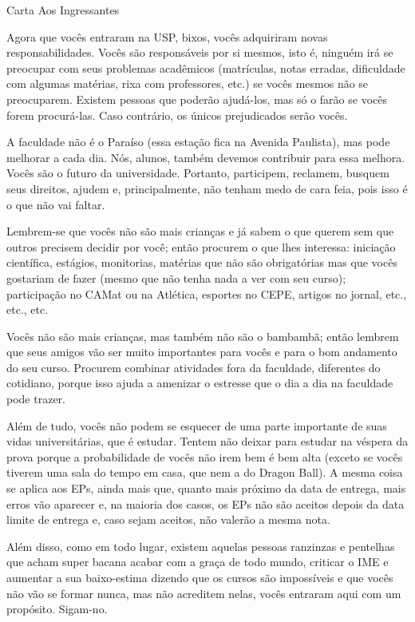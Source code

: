 \begin{editorial}{Carta Aos Ingressantes}

Agora que vocês entraram na USP, bixos, vocês adquiriram novas
responsabilidades.  Vocês são responsáveis por si mesmos, isto é, ninguém irá se
preocupar com seus problemas acadêmicos (matrículas, notas erradas, dificuldade
com algumas matérias, rixa com professores, etc.) se vocês mesmos não se
preocuparem. Existem pessoas que poderão ajudá-los, mas só o farão se vocês
forem procurá-las. Caso contrário, os únicos prejudicados serão vocês.

A faculdade não é o Paraíso (essa estação fica na Avenida Paulista), mas pode
melhorar a cada dia. Nós, alunos, também devemos contribuir para essa melhora.
Vocês são o futuro da universidade. Portanto, participem, reclamem, busquem seus
direitos, ajudem e, principalmente, não tenham medo de cara feia, pois isso é o
que não vai faltar.

Lembrem-se que vocês não são mais crianças e já sabem o que querem sem que
outros precisem decidir por você; então procurem o que lhes interessa: iniciação
científica, estágios, monitorias, matérias que não são obrigatórias mas que
vocês gostariam de fazer (mesmo que não tenha nada a ver com seu curso);
participação no CAMat ou na Atlética, esportes no CEPE, artigos no jornal, etc.,
etc., etc.

Vocês não são mais crianças, mas também não são o bambambã; então lembrem que
seus amigos vão ser muito importantes para vocês e para o bom andamento do seu
curso. Procurem combinar atividades fora da faculdade, diferentes do cotidiano,
porque isso ajuda a amenizar o estresse que o dia a dia na faculdade pode
trazer.

Além de tudo, vocês não podem se esquecer de uma parte importante de suas vidas
universitárias, que é estudar. Tentem não deixar para estudar na véspera da
prova porque a probabilidade de vocês não irem bem é bem alta (exceto se vocês
tiverem uma sala do tempo em casa, que nem a do Dragon Ball). A mesma coisa se
aplica aos EPs, ainda mais que, quanto mais próximo da data de entrega, mais
erros vão aparecer e, na maioria dos casos, os EPs não são aceitos depois da
data limite de entrega e, caso sejam aceitos, não valerão a mesma nota.

Além disso, como em todo lugar, existem aquelas pessoas ranzinzas e
pentelhas que acham super bacana acabar com a graça de todo mundo,
criticar o IME e aumentar a sua baixo-estima dizendo que os cursos
são impossíveis e que vocês não vão se formar nunca, mas não acreditem
nelas, vocês entraram aqui com um propósito. Sigam-no.  


\end{editorial}
